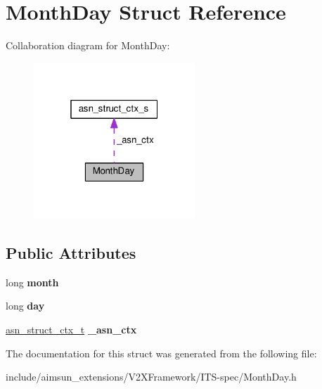 \hypertarget{structMonthDay}{}\section{Month\+Day Struct Reference}
\label{structMonthDay}


Collaboration diagram for Month\+Day\+:\nopagebreak
\begin{figure}[H]
\begin{center}
\leavevmode
\includegraphics[width=172pt]{structMonthDay__coll__graph}
\end{center}
\end{figure}
\subsection*{Public Attributes}
\begin{DoxyCompactItemize}
\item 
long {\bfseries month}\hypertarget{structMonthDay_ad6b3999d3c36efd463288a6cd7af2740}{}\label{structMonthDay_ad6b3999d3c36efd463288a6cd7af2740}

\item 
long {\bfseries day}\hypertarget{structMonthDay_a6ec23787495e861b473e370608019ea4}{}\label{structMonthDay_a6ec23787495e861b473e370608019ea4}

\item 
\hyperlink{structasn__struct__ctx__s}{asn\+\_\+struct\+\_\+ctx\+\_\+t} {\bfseries \+\_\+asn\+\_\+ctx}\hypertarget{structMonthDay_a94b304f8139018ca7a2d81d42b66b2d8}{}\label{structMonthDay_a94b304f8139018ca7a2d81d42b66b2d8}

\end{DoxyCompactItemize}


The documentation for this struct was generated from the following file\+:\begin{DoxyCompactItemize}
\item 
include/aimsun\+\_\+extensions/\+V2\+X\+Framework/\+I\+T\+S-\/spec/Month\+Day.\+h\end{DoxyCompactItemize}
